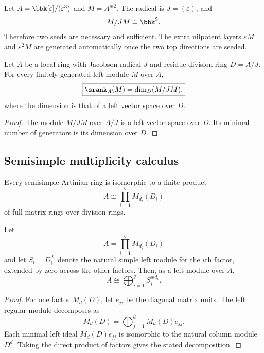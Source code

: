 \begin{microexample}[title={A local nilpotent algebra}]
Let \(A=\bbk[\varepsilon]/(\varepsilon^3)\) and \(M=A^{\oplus2}\).  The radical is \(J=(\varepsilon)\), and
\[
M/JM\cong\bbk^2.
\]
Therefore two seeds are necessary and sufficient.  The extra nilpotent layers \(\varepsilon M\) and \(\varepsilon^2M\) are generated automatically once the two top directions are seeded.
\end{microexample}


\begin{corollary}
\label{cor:local-algebra-formula}
Let $A$ be a local ring with Jacobson radical $J$ and residue division ring $D=A/J$.  For every finitely generated left module $M$ over $A$,
\[
\boxed{
\srank_A(M)=\dim_D(M/JM),
}
\]
where the dimension is that of a left vector space over $D$.
\end{corollary}

\begin{proof}
The module $M/JM$ over $A/J$ is a left vector space over $D$.  Its minimal number of generators is its dimension over $D$.
\end{proof}

\subsection{Semisimple multiplicity calculus}
\begin{classicalinput}
\label{ci:wedderburn}
Every semisimple Artinian ring is isomorphic to a finite product
\[
A\cong\prod_{i=1}^{q}M_{d_i}(D_i)
\]
of full matrix rings over division rings.
\end{classicalinput}

\begin{lemma}
\label{lem:regular-multiplicities}
Let
\[
A=\prod_{i=1}^{q}M_{d_i}(D_i)
\]
and let $S_i=D_i^{d_i}$ denote the natural simple left module for the $i$th factor, extended by zero across the other factors.  Then, as a left module over $A$,
\[
\boxed{A\cong\bigoplus_{i=1}^{q}S_i^{\oplus d_i}.}
\]
\end{lemma}

\begin{proof}
For one factor $M_d(D)$, let $e_{jj}$ be the diagonal matrix units.  The left regular module decomposes as
\[
M_d(D)=\bigoplus_{j=1}^{d}M_d(D)e_{jj}.
\]
Each minimal left ideal $M_d(D)e_{jj}$ is isomorphic to the natural column module $D^d$.  Taking the direct product of factors gives the stated decomposition.
\end{proof}

